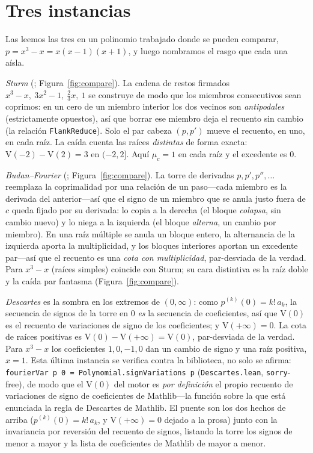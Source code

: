 \documentclass[11pt]{article}
\newcommand{\lean}[1]{{\def\_{\textunderscore\allowbreak}\texttt{#1}}}
\newcommand{\V}{\mathrm{V}}
\begin{document}
\section{Tres instancias}\label{sec:three}

Las leemos las tres en un polinomio trabajado donde se pueden comparar, $p=x^3-x=x(x-1)(x+1)$, y luego
nombramos el rasgo que cada una a\'isla.

\emph{Sturm} (\cite{sturmlean}; Figura~\ref{fig:compare}). La cadena de restos firmados
$x^3{-}x,\ 3x^2{-}1,\ \tfrac23 x,\ 1$ se construye de modo que los miembros consecutivos sean coprimos: en
un cero de un miembro interior los dos vecinos son \emph{antipodales} (estrictamente opuestos), as\'i que
borrar ese miembro deja el recuento sin cambio (la relaci\'on \lean{FlankReduce}). Solo el par cabeza
$(p,p')$ mueve el recuento, en uno, en cada ra\'iz. La ca\'ida cuenta las ra\'ices \emph{distintas} de forma
exacta: $\V(-2)-\V(2)=3$ en $(-2,2]$. Aqu\'i $\mu_c=1$ en cada ra\'iz y el excedente es $0$.

\emph{Budan--Fourier} (\cite{budanlean}; Figura~\ref{fig:compare}). La torre de derivadas $p,p',p'',\dots$
reemplaza la coprimalidad por una relaci\'on de un paso---cada miembro es la derivada del anterior---as\'i
que el signo de un miembro que se anula justo fuera de $c$ queda fijado por su derivada: lo copia a la
derecha (el bloque \emph{colapsa}, sin cambio nuevo) y lo niega a la izquierda (el bloque \emph{alterna}, un
cambio por miembro). En una ra\'iz m\'ultiple se anula un bloque entero, la alternancia de la izquierda aporta
la multiplicidad, y los bloques interiores aportan un excedente par---as\'i que el recuento es una
\emph{cota con multiplicidad}, par-desviada de la verdad. Para $x^3-x$ (ra\'ices simples) coincide con Sturm;
su cara distintiva es la ra\'iz doble y la ca\'ida par fantasma (Figura~\ref{fig:compare}).

\emph{Descartes} es la sombra en los extremos de $(0,\infty)$: como $p^{(k)}(0)=k!\,a_k$, la secuencia de
signos de la torre en $0$ \emph{es} la secuencia de coeficientes, as\'i que $\V(0)$ es el recuento de
variaciones de signo de los coeficientes; y $\V(+\infty)=0$. La cota de ra\'ices positivas es
$\V(0)-\V(+\infty)=\V(0)$, par-desviada de la verdad. Para $x^3-x$ los coeficientes $1,0,-1,0$ dan un cambio
de signo y una ra\'iz positiva, $x=1$. Esta \'ultima instancia se verifica contra la biblioteca, no solo se
afirma: \lean{fourierVar p 0 = Polynomial.signVariations p} (\lean{Descartes.lean}, \lean{sorry}-free), de
modo que el $\V(0)$ del motor es \emph{por definici\'on} el propio recuento de variaciones de signo de
coeficientes de Mathlib---la funci\'on sobre la que est\'a enunciada la regla de Descartes de Mathlib. El
puente son los dos hechos de arriba ($p^{(k)}(0)=k!\,a_k$, y $\V(+\infty)=0$ dejado a la prosa) junto con la
invariancia por reversi\'on del recuento de signos, listando la torre los signos de menor a mayor y la lista
de coeficientes de Mathlib de mayor a menor.
\end{document}
